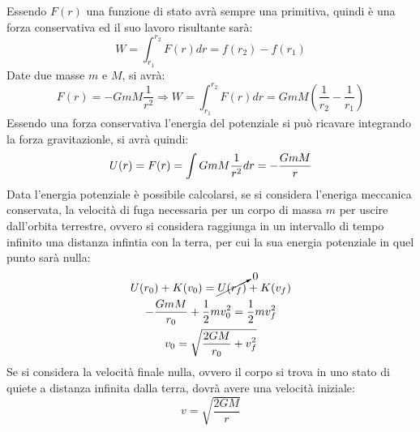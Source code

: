 \documentclass{article}
\numberwithin{equation}{subsection}
\begin{document}
Essendo $F(r)$ una funzione di stato avrà sempre una primitiva, quindi è una forza conservativa ed il suo lavoro risultante sarà:
\begin{equation}
    W=\displaystyle\int_{r_1}^{r_2}F(r)dr=f(r_2)-f(r_1)
\end{equation}
Date due masse $m$ e $M$, si avrà: 
\begin{equation}
    F(r)=-GmM\displaystyle\frac{1}{r^2}\Rightarrow W=\displaystyle\int_{r_1}^{r_2}F(r)dr=GmM\left(\frac{1}{r_2}-\frac{1}{r_1}\right)
\end{equation}
Essendo una forza conservativa l'energia del potenziale si può ricavare integrando la forza gravitazionle, si avrà quindi:
\begin{equation}
    U(r)=\-F(r)=\displaystyle\int GmM\frac{1}{r^2}dr=-\frac{GmM}{r}
\end{equation}
Data l'energia potenziale è possibile  calcolarsi, se si considera l'eneriga meccanica conservata, la velocità di fuga necessaria per un corpo di 
massa $m$ per uscire dall'orbita terrestre, ovvero si considera raggiunga in un intervallo di tempo infinito una distanza infintia con la terra, per 
cui la sua energia potenziale in quel punto sarà nulla:
\begin{gather}
    U(r_0)+K(v_0)=\cancelto{0}{U(r_f)}+K(v_f)\\
    -\displaystyle\frac{GmM}{r_0}+\frac{1}{2}mv_0^2=\frac{1}{2}mv_f^2\\
    v_0=\displaystyle\sqrt{\displaystyle\frac{2GM}{r_0}+v_f^2}
\end{gather}
Se si considera la velocità finale nulla, ovvero il corpo si trova in uno stato di quiete a distanza infinita dalla terra, dovrà avere 
una velocità iniziale:
\begin{equation}
    v=\displaystyle\sqrt{\frac{2GM}{r}}
\end{equation}
\end{document}
